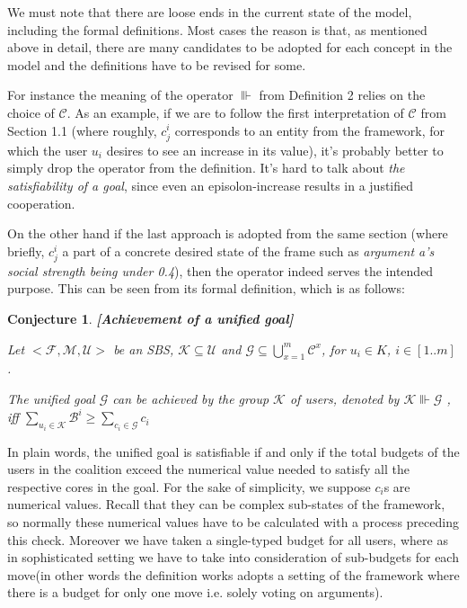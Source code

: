 \documentclass{article}
\newtheorem{conjecture}{Conjecture}
\begin{document}
We must note that there are loose ends in the current state of the model, including the formal definitions. Most cases the reason is that, as mentioned above in detail, there are many candidates to be adopted for each concept in the model and the definitions have to be revised for some.

For instance the meaning of the operator $\Vvdash$ from Definition 2 relies on the choice of $\mathcal{C}$. As an example, if we are to follow the first interpretation of $\mathcal{C}$ from Section 1.1 (where roughly, $c_j^i$ corresponds to an entity from the framework, for which the user $u_i$ desires to see an increase in its value), it's probably better to simply drop the operator from the definition. It's hard to talk about \emph{the satisfiability of a goal}, since even an episolon-increase results in a justified cooperation. 

On the other hand if the last approach is adopted from the same section (where briefly, $c_j^i$ a part of a concrete desired state of the frame such as \emph{argument a's social strength being under 0.4}), then the operator indeed serves the intended purpose. This can be seen from its formal definition, which is as follows:

{\color{red}
\begin{conjecture}\textbf{[Achievement of a unified goal]}

Let  $<\mathcal{F}, \mathcal{M}, \mathcal{U}>$ be an SBS,  $\mathcal{K} \subseteq \mathcal{U}$ and $\mathcal{G} \subseteq \bigcup_{x=1}^{m} \mathcal{C}^{x} $,  for $u_i \in K$, $i \in [1..m]$.

The unified goal $\mathcal{G}$ can be achieved by the group $\mathcal{K}$ of users, denoted by $ \mathcal{K} \Vvdash \mathcal{G}$ , iff $\sum_{u_{i} \in \mathcal{K}} \mathcal{B}^i \geq \sum_{c_{i} \in \mathcal{G}} c_i $ 


\end{conjecture}
}


In plain words, the unified goal is satisfiable if and only if the total budgets of the users in the coalition exceed the numerical value needed to satisfy all the respective cores in the goal. For the sake of simplicity, we suppose $c_i$s are numerical values. Recall that they can be complex sub-states of the framework, so normally these numerical values have to be calculated with a process preceding this check. Moreover we have taken a single-typed budget for all users, where as in sophisticated setting we have to take into consideration of sub-budgets for each move(in other words the definition works adopts a setting of the framework where there is a budget for only one move i.e. solely voting on arguments). 
\end{document}
